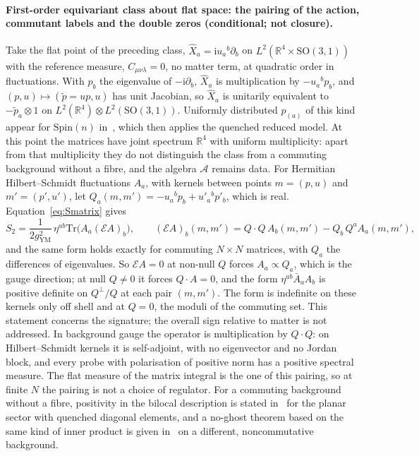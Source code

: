 \paragraph{First-order equivariant class about flat space: the pairing of the action, commutant labels and the double zeros (conditional; not closure).}
Take the flat point of the preceding class, \(\hat X_a=\mathrm iu_a{}^b\partial_b\) on \(L^2(\mathbb R^4\times\mathrm{SO}(3,1))\) with the reference measure, \(C_{\mu\nu\lambda}=0\), no matter term, at quadratic order in fluctuations. With \(p_b\) the eigenvalue of \(-\mathrm i\partial_b\), \(\hat X_a\) is multiplication by \(-u_a{}^bp_b\), and \((p,u)\mapsto(\tilde p=up,u)\) has unit Jacobian, so \(\hat X_a\) is unitarily equivalent to \(-\tilde p_a\otimes1\) on \(L^2(\mathbb R^4)\otimes L^2(\mathrm{SO}(3,1))\). Uniformly distributed \(p_{(a)}\) of this kind appear for \(\mathrm{Spin}(n)\) in~\cite{Hanada2006}, which then applies the quenched reduced model. At this point the matrices have joint spectrum \(\mathbb R^4\) with uniform multiplicity: apart from that multiplicity they do not distinguish the class from a commuting background without a fibre, and the algebra \(\mathcal A\) remains data. For Hermitian Hilbert--Schmidt fluctuations \(A_a\), with kernels between points \(m=(p,u)\) and \(m'=(p',u')\), let \(Q_a(m,m')=-u_a{}^bp_b+u'_a{}^bp'_b\), which is real. Equation~\eqref{eq:Smatrix} gives
\[
S_2=\frac1{2g_{\mathrm{YM}}^2}\,\eta^{ab}\mathrm{Tr}\bigl(A_a(\mathcal EA)_b\bigr),\qquad
(\mathcal EA)_b(m,m')=Q\cdot Q\,A_b(m,m')-Q_b\,Q^aA_a(m,m'),
\]
and the same form holds exactly for commuting \(N\times N\) matrices, with \(Q_a\) the differences of eigenvalues. So \(\mathcal EA=0\) at non-null \(Q\) forces \(A_a\propto Q_a\), which is the gauge direction; at null \(Q\neq0\) it forces \(Q\cdot A=0\), and the form \(\eta^{ab}\bar A_aA_b\) is positive definite on \(Q^\perp/Q\) at each pair \((m,m')\). The form is indefinite on these kernels only off shell and at \(Q=0\), the moduli of the commuting set. This statement concerns the signature; the overall sign relative to matter is not addressed. In background gauge the operator is multiplication by \(Q\cdot Q\): on Hilbert--Schmidt kernels it is self-adjoint, with no eigenvector and no Jordan block, and every probe with polarisation of positive norm has a positive spectral measure. The flat measure of the matrix integral is the one of this pairing, so at finite \(N\) the pairing is not a choice of regulator. For a commuting background without a fibre, positivity in the bilocal description is stated in~\cite{HoKawaiSteinacker2025} for the planar sector with quenched diagonal elements, and a no-ghost theorem based on the same kind of inner product is given in~\cite{Steinacker2019NoGhost} on a different, noncommutative background.


